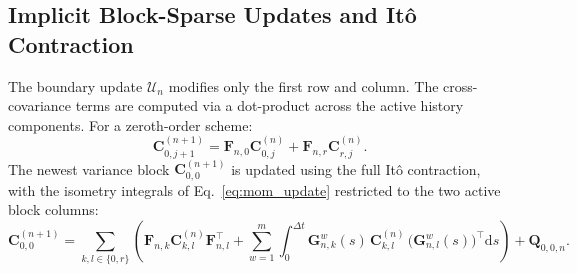 \documentclass[preprint,12pt]{elsarticle}
\begin{document}
\subsection{Implicit Block-Sparse Updates and It\^o Contraction}
The boundary update $\mathcal{U}_n$ modifies only the first row and column. The cross-covariance terms are computed via a dot-product across the active history components. For a zeroth-order scheme:
\begin{equation}
\mathbf{C}_{0,j+1}^{(n+1)} = \mathbf{F}_{n,0} \mathbf{C}_{0,j}^{(n)} + \mathbf{F}_{n,r} \mathbf{C}_{r,j}^{(n)}.
\end{equation}
The newest variance block $\mathbf{C}_{0,0}^{(n+1)}$ is updated using the full It\^o contraction, with the isometry integrals of Eq.~\eqref{eq:mom_update} restricted to the two active block columns:
\begin{equation}
\label{eq:ito_injection}
\mathbf{C}_{0,0}^{(n+1)} = \sum_{k,l \in \{0,r\}} \left( \mathbf{F}_{n,k} \mathbf{C}_{k,l}^{(n)} \mathbf{F}_{n,l}^\top + \sum_{w=1}^m \int_0^{\Delta t} \mathbf{G}_{n,k}^w(s)\, \mathbf{C}_{k,l}^{(n)}\, \big(\mathbf{G}_{n,l}^w(s)\big)^\top \mathrm{d}s \right) + \mathbf{Q}_{0,0,n}.
\end{equation}
\end{document}
